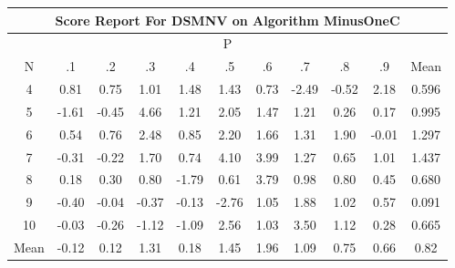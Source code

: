 \documentclass[11pt,a4paper]{report}
\begin{document}
\begin{longtable}{ | c || c | c | c | c | c | c | c | c | c || c |}
\hline
\multicolumn{11}{|c|}{ Score Report For DSMNV on Algorithm MinusOneC} \\
\hline
\multicolumn{11}{|c|}{ P } \\
\hline
N & .1 & .2 & .3 & .4 & .5 & .6 & .7 & .8 & .9 & Mean\\
 \hline
 \hline
 \endhead
  4 &  \cellcolor[HTML]{E7E7FF} 0.81 &  \cellcolor[HTML]{EFEFFF} 0.75 &  \cellcolor[HTML]{E7E7FF} 1.01 &  \cellcolor[HTML]{D7D7FF} 1.48 &  \cellcolor[HTML]{DFDFFF} 1.43 &  \cellcolor[HTML]{EFEFFF} 0.73 &  \cellcolor[HTML]{FFBFBF} -2.49 &  \cellcolor[HTML]{FFEFEF} -0.52 &  \cellcolor[HTML]{C7C7FF} 2.18 & 0.596 \\
  5 &  \cellcolor[HTML]{FFD7D7} -1.61 &  \cellcolor[HTML]{FFF7F7} -0.45 &  \cellcolor[HTML]{8787FF} 4.66 &  \cellcolor[HTML]{DFDFFF} 1.21 &  \cellcolor[HTML]{CFCFFF} 2.05 &  \cellcolor[HTML]{D7D7FF} 1.47 &  \cellcolor[HTML]{DFDFFF} 1.21 &  \cellcolor[HTML]{F7F7FF} 0.26 &  \cellcolor[HTML]{F7F7FF} 0.17 & 0.995 \\
  6 &  \cellcolor[HTML]{EFEFFF} 0.54 &  \cellcolor[HTML]{EFEFFF} 0.76 &  \cellcolor[HTML]{BFBFFF} 2.48 &  \cellcolor[HTML]{E7E7FF} 0.85 &  \cellcolor[HTML]{C7C7FF} 2.20 &  \cellcolor[HTML]{D7D7FF} 1.66 &  \cellcolor[HTML]{DFDFFF} 1.31 &  \cellcolor[HTML]{CFCFFF} 1.90 &  \cellcolor[HTML]{FFFFFF} -0.01 & 1.297 \\
  7 &  \cellcolor[HTML]{FFF7F7} -0.31 &  \cellcolor[HTML]{FFF7F7} -0.22 &  \cellcolor[HTML]{D7D7FF} 1.70 &  \cellcolor[HTML]{EFEFFF} 0.74 &  \cellcolor[HTML]{9797FF} 4.10 &  \cellcolor[HTML]{9797FF} 3.99 &  \cellcolor[HTML]{DFDFFF} 1.27 &  \cellcolor[HTML]{EFEFFF} 0.65 &  \cellcolor[HTML]{E7E7FF} 1.01 & 1.437 \\
  8 &  \cellcolor[HTML]{F7F7FF} 0.18 &  \cellcolor[HTML]{F7F7FF} 0.30 &  \cellcolor[HTML]{E7E7FF} 0.80 &  \cellcolor[HTML]{FFCFCF} -1.79 &  \cellcolor[HTML]{EFEFFF} 0.61 &  \cellcolor[HTML]{9F9FFF} 3.79 &  \cellcolor[HTML]{E7E7FF} 0.98 &  \cellcolor[HTML]{E7E7FF} 0.80 &  \cellcolor[HTML]{F7F7FF} 0.45 & 0.680 \\
  9 &  \cellcolor[HTML]{FFF7F7} -0.40 &  \cellcolor[HTML]{FFFFFF} -0.04 &  \cellcolor[HTML]{FFF7F7} -0.37 &  \cellcolor[HTML]{FFFFFF} -0.13 &  \cellcolor[HTML]{FFB7B7} -2.76 &  \cellcolor[HTML]{E7E7FF} 1.05 &  \cellcolor[HTML]{CFCFFF} 1.88 &  \cellcolor[HTML]{E7E7FF} 1.02 &  \cellcolor[HTML]{EFEFFF} 0.57 & 0.091 \\
  10 &  \cellcolor[HTML]{FFFFFF} -0.03 &  \cellcolor[HTML]{FFF7F7} -0.26 &  \cellcolor[HTML]{FFDFDF} -1.12 &  \cellcolor[HTML]{FFE7E7} -1.09 &  \cellcolor[HTML]{BFBFFF} 2.56 &  \cellcolor[HTML]{E7E7FF} 1.03 &  \cellcolor[HTML]{A7A7FF} 3.50 &  \cellcolor[HTML]{DFDFFF} 1.12 &  \cellcolor[HTML]{F7F7FF} 0.28 & 0.665 \\
 \hline
 \hline
Mean &  \cellcolor[HTML]{FFFFFF} -0.12 &  \cellcolor[HTML]{FFFFFF} 0.12 &  \cellcolor[HTML]{DFDFFF} 1.31 &  \cellcolor[HTML]{F7F7FF} 0.18 &  \cellcolor[HTML]{D7D7FF} 1.45 &  \cellcolor[HTML]{CFCFFF} 1.96 &  \cellcolor[HTML]{E7E7FF} 1.09 &  \cellcolor[HTML]{EFEFFF} 0.75 &  \cellcolor[HTML]{EFEFFF} 0.66 &  \cellcolor[HTML]{E7E7FF} 0.82
\end{longtable}
\end{document}
